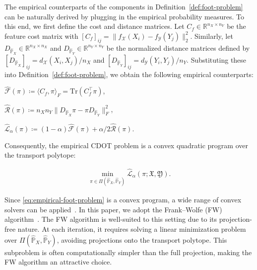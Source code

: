 \documentclass{article}
\theoremstyle{plain}
\theoremstyle{definition}
\theoremstyle{remark}
\begin{document}
The empirical counterparts of the components in Definition~\ref{def:foot-problem} can be naturally derived by plugging in the empirical probability measures. To this end, we first define the cost and distance matrices. Let $C_f \in \mathbb{R}^{n_X \times n_Y}$ be the feature cost matrix with $[C_f]_{ij} = \|f_{\mathcal{X}}(X_i) - f_{\mathcal{Y}}(Y_j)\|_2^2$. Similarly, let $D_{\hat{\mathbb{P}}_X} \in \mathbb{R}^{n_X \times n_X}$ and $D_{\hat{\mathbb{P}}_Y} \in \mathbb{R}^{n_Y \times n_Y}$ be the normalized distance matrices defined by $[D_{\hat{\mathbb{P}}_X}]_{ij} = d_{\mathcal{X}}(X_i,X_j)/n_X$ and $[D_{\hat{\mathbb{P}}_Y}]_{ij} = d_{\mathcal{Y}}(Y_i,Y_j)/n_Y$. Substituting these into Definition~\ref{def:foot-problem}, we obtain the following empirical counterparts: 
\begin{description} \vspace{-3mm}
	\item[Empirical feature:] $\hat{\mathcal{F}}(\pi) \coloneqq \langle C_f, \pi \rangle_F = \mathrm{Tr}(C_f^{\top}\pi)$,
	\item[Empirical structure:] $\hat{\mathcal{R}}(\pi) \coloneqq n_X n_Y \| D_{\hat{\mathbb{P}}_X}\pi - \pi D_{\hat{\mathbb{P}}_Y} \|_F^2$,
	\item[Empirical objective:] $\hat{\mathcal{L}}_{\alpha}(\pi) \coloneqq (1-\alpha)\hat{\mathcal{F}}(\pi) + \alpha/2\hat{\mathcal{R}}(\pi)$.
\end{description} \vspace{-2mm}

Consequently, the empirical CDOT problem is a convex quadratic program over the transport polytope:

\vspace{-3mm}
\begin{align}  
	\label{eq:empirical-foot-problem}
	\min_{\pi \in \Pi(\hat{\mathbb{P}}_X,\hat{\mathbb{P}}_Y)} \hat{\mathcal{L}}_{\alpha}(\pi; \mathfrak{X},\mathfrak{Y}) .
\end{align} 
\vspace{-3mm}

Since \eqref{eq:empirical-foot-problem} is a convex program, a wide range of convex solvers can be applied~\citep{boyd2004convex}. In this paper, we adopt the Frank--Wolfe (FW) algorithm~\citep{frank1956algorithm}. The FW algorithm is well-suited to this setting due to its projection-free nature. At each iteration, it requires solving a linear minimization problem over $\Pi(\hat{\mathbb{P}}_X,\hat{\mathbb{P}}_Y)$, avoiding projections onto the transport polytope. This subproblem is often computationally simpler than the full projection, making the FW algorithm an attractive choice.
\end{document}
